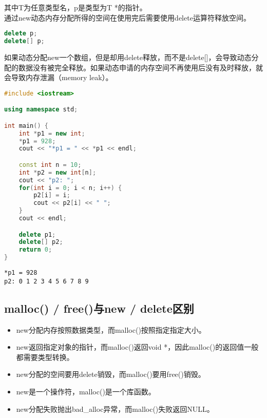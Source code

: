 其中T为任意类型名，p是类型为T *的指针。 \\

通过new动态内存分配所得的空间在使用完后需要使用delete运算符释放空间。

\vspace{-0.5cm}

\begin{lstlisting}[language=C++]
delete p;
delete[] p;
\end{lstlisting}

如果动态分配new一个数组，但是却用delete释放，而不是delete[]，会导致动态分配的数据没有被完全释放。如果动态申请的内存空间不再使用后没有及时释放，就会导致内存泄漏（memory leak）。 \\


\begin{lstlisting}[language=C++]
#include <iostream>

using namespace std;

int main() {
    int *p1 = new int;
    *p1 = 928;
    cout << "*p1 = " << *p1 << endl;

    const int n = 10;
    int *p2 = new int[n];
    cout << "p2: ";
    for(int i = 0; i < n; i++) {
        p2[i] = i;
        cout << p2[i] << " ";
    }
    cout << endl;

    delete p1;
    delete[] p2;
    return 0;
}
\end{lstlisting}

\begin{tcolorbox}
    \begin{verbatim}
*p1 = 928
p2: 0 1 2 3 4 5 6 7 8 9
	\end{verbatim}
\end{tcolorbox}

\subsection{malloc() / free()与new / delete区别}

\begin{itemize}
    \item new分配内存按照数据类型，而malloc()按照指定指定大小。

    \item new返回指定对象的指针，而malloc()返回void *，因此malloc()的返回值一般都需要类型转换。

    \item new分配的空间要用delete销毁，而malloc()要用free()销毁。

    \item new是一个操作符，malloc()是一个库函数。

    \item new分配失败抛出bad\_alloc异常，而malloc()失败返回NULL。
\end{itemize}

